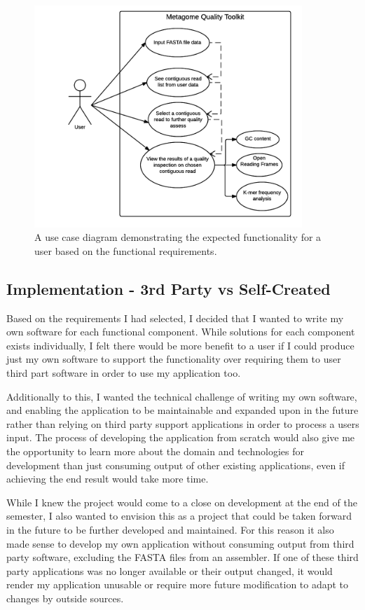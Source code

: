 \begin{figure}[H]
 \centering
\includegraphics[width=0.9\textwidth]{images/usecase}
\caption{A use case diagram demonstrating the expected functionality for a user based on the functional requirements.}
\end{figure}

\subsection{Implementation - 3rd Party vs Self-Created}
Based on the requirements I had selected, I decided that I wanted to write my own software for each functional component. While solutions for each component exists individually, I felt there would be more benefit to a user if I could produce just my own software to support the functionality over requiring them to user third part software in order to use my application too.

Additionally to this, I wanted the technical challenge of writing my own software, and enabling the application to be maintainable and expanded upon in the future rather than relying on third party support applications in order to process a users input. The process of developing the application from scratch would also give me the opportunity to learn more about the domain and technologies for development than just consuming output of other existing applications, even if achieving the end result would take more time.

While I knew the project would come to a close on development at the end of the semester, I also wanted to envision this as a project that could be taken forward in the future to be further developed and maintained. For this reason it also made sense to develop my own application without consuming output from third party software, excluding the FASTA files from an assembler. If one of these third party applications was no longer available or their output changed, it would render my application unusable or require more future modification to adapt to changes by outside sources.

